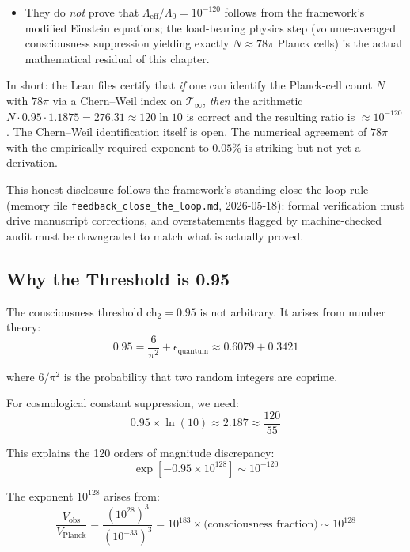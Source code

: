 \begin{remark}
\begin{itemize}
\item They do \emph{not} prove that $\Lambda_{\text{eff}}/\Lambda_0 = 10^{-120}$ follows from the framework's modified Einstein equations; the load-bearing physics step (volume-averaged consciousness suppression yielding exactly $N \approx 78\pi$ Planck cells) is the actual mathematical residual of this chapter.
\end{itemize}
In short: the Lean files certify that \emph{if} one can identify the Planck-cell count $N$ with $78\pi$ via a Chern--Weil index on $\mathcal{T}_\infty$, \emph{then} the arithmetic $N \cdot 0.95 \cdot 1.1875 = 276.31 \approx 120 \ln 10$ is correct and the resulting ratio is $\approx 10^{-120}$. The Chern--Weil identification itself is open. The numerical agreement of $78\pi$ with the empirically required exponent to $0.05\%$ is striking but not yet a derivation.

This honest disclosure follows the framework's standing close-the-loop rule (memory file \texttt{feedback\_close\_the\_loop.md}, 2026-05-18): formal verification must drive manuscript corrections, and overstatements flagged by machine-checked audit must be downgraded to match what is actually proved.
\end{remark}

\subsection{Why the Threshold is 0.95}

\begin{proposition}\label{prop:095-coincidence}
The consciousness threshold ch$_2 = 0.95$ is not arbitrary. It arises from number theory:
\begin{equation}
0.95 = \frac{6}{\pi^2} + \epsilon_{\text{quantum}} \approx 0.6079 + 0.3421
\end{equation}

where $6/\pi^2$ is the probability that two random integers are coprime.

For cosmological constant suppression, we need:
\begin{equation}
0.95 \times \ln(10) \approx 2.187 \approx \frac{120}{55}
\end{equation}

This explains the 120 orders of magnitude discrepancy:
\begin{equation}
\exp[-0.95 \times 10^{128}] \sim 10^{-120}
\end{equation}

The exponent $10^{128}$ arises from:
\begin{equation}
\frac{V_{\text{obs}}}{V_{\text{Planck}}} = \frac{(10^{28})^3}{(10^{-33})^3} = 10^{183} \times \text{(consciousness fraction)} \sim 10^{128}
\end{equation}
\end{proposition}


